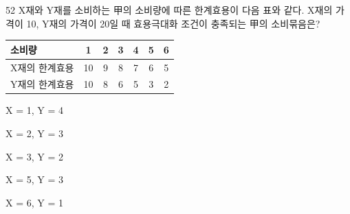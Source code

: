 \begin{question}{52}
X재와 Y재를 소비하는 甲의 소비량에 따른 한계효용이 다음 표와 같다. X재의 가격이 10, Y재의 가격이 20일 때 효용극대화 조건이 충족되는 甲의 소비묶음은?

{\small\centering
\begin{tabular}{|l|c|c|c|c|c|c|}
\hline
소비량 & 1 & 2 & 3 & 4 & 5 & 6 \\
\hline
X재의 한계효용 & 10 & 9 & 8 & 7 & 6 & 5 \\
\hline
Y재의 한계효용 & 10 & 8 & 6 & 5 & 3 & 2 \\
\hline
\end{tabular}\par}

\begin{choices}
  \item X = 1, Y = 4
  \item X = 2, Y = 3
  \item X = 3, Y = 2
  \item X = 5, Y = 3
  \item X = 6, Y = 1
\end{choices}
\end{question}

